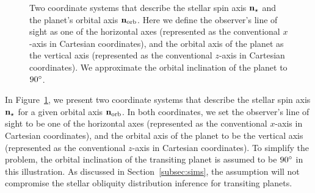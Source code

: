\documentclass[twocolumn,times]{aastex631}
\begin{document}
\begin{figure*}[ht!]
    \vspace*{-1cm}
    \caption{Two coordinate systems that describe the stellar spin axis $\bf{n}_{\star}$ and the planet's orbital axis $\bf{n}_{\rm orb}$. Here we define the observer's line of sight as one of the horizontal axes (represented as the conventional $x$-axis in Cartesian coordinates), and the orbital axis of the planet as the vertical axis (represented as the conventional $z$-axis in Cartesian coordinates). We approximate the orbital inclination of the planet to $90\mbox{$^\circ$}$.}
    \label{fig:coord}
\end{figure*}

In Figure~\ref{fig:coord}, we present two coordinate systems that describe the stellar spin axis $\bf{n}_{\star}$ for a given orbital axis $\bf{n}_{\rm orb}$. In both coordinates, we set the observer's line of sight to be one of the horizontal axes (represented as the conventional $x$-axis in Cartesian coordinates), and the orbital axis of the planet to be the vertical axis (represented as the conventional $z$-axis in Cartesian coordinates). To simplify the problem, the orbital inclination of the transiting planet is assumed to be $90\mbox{$^\circ$}$ in this illustration. As discussed in Section~\ref{subsec:sims}, the assumption will not compromise the stellar obliquity distribution inference for transiting planets.
\end{document}
